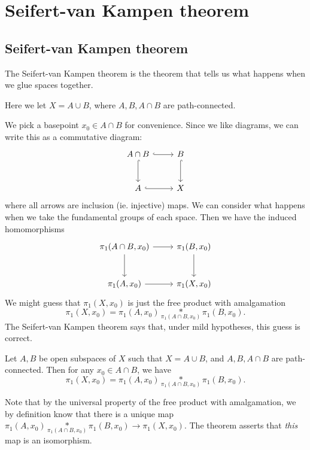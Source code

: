 \documentclass[a4paper]{article}
\begin{document}
\section{Seifert-van Kampen theorem}
\subsection{Seifert-van Kampen theorem}
The Seifert-van Kampen theorem is the theorem that tells us what happens when we glue spaces together.

Here we let $X = A\cup B$, where $A, B, A\cap B$ are path-connected.
\begin{center}
\end{center}
We pick a basepoint $x_0 \in A\cap B$ for convenience. Since we like diagrams, we can write this as a commutative diagram:
\[
  \begin{tikzcd}[row sep=large]
    A\cap B \ar [r, hook] \ar[d, hook] & B\ar[d, hook]\\
    A \ar [r, hook] & X
  \end{tikzcd}
\]
where all arrows are inclusion (ie. injective) maps. We can consider what happens when we take the fundamental groups of each space. Then we have the induced homomorphisms
\[
  \begin{tikzcd}[row sep=large]
    \pi_1(A\cap B, x_0) \ar [r] \ar[d] & \pi_1(B, x_0)\ar[d]\\
    \pi_1(A, x_0) \ar [r] & \pi_1(X, x_0)
  \end{tikzcd}
\]
We might guess that $\pi_1(X, x_0)$ is just the free product with amalgamation
\[
  \pi_1(X, x_0) = \pi_1(A, x_0) \underset{\pi_1(A\cap B, x_0)}{*} \pi_1(B, x_0).
\]
The Seifert-van Kampen theorem says that, under mild hypotheses, this guess is correct.

\begin{thm}
  Let $A, B$ be open subspaces of $X$ such that $X = A\cup B$, and $A, B, A\cap B$ are path-connected. Then for any $x_0 \in A\cap B$, we have
  \[
    \pi_1(X, x_0) = \pi_1(A, x_0) \underset{\pi_1(A\cap B, x_0)}{*} \pi_1(B, x_0).
  \]
\end{thm}
Note that by the universal property of the free product with amalgamation, we by definition know that there is a unique map $\pi_1(A, x_0) \underset{\pi_1(A\cap B, x_0)}{*} \pi_1(B, x_0) \to \pi_1(X, x_0)$. The theorem asserts that \emph{this} map is an isomorphism.
\end{document}
